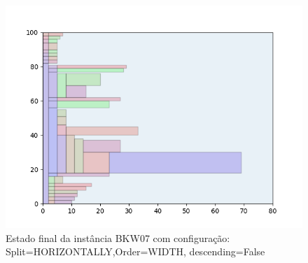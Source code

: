 \begin{figure}[H]
    \centering
    \caption[]{Estado final da instância BKW07 com configuração: Split=HORIZONTALLY,Order=WIDTH, descending=False}
    \label{fig:bkw07-horizontally-width-false}
    \includegraphics[scale=0.5]{output/figures/bkw/bkw07/horizontally/width/false/00}
\end{figure}